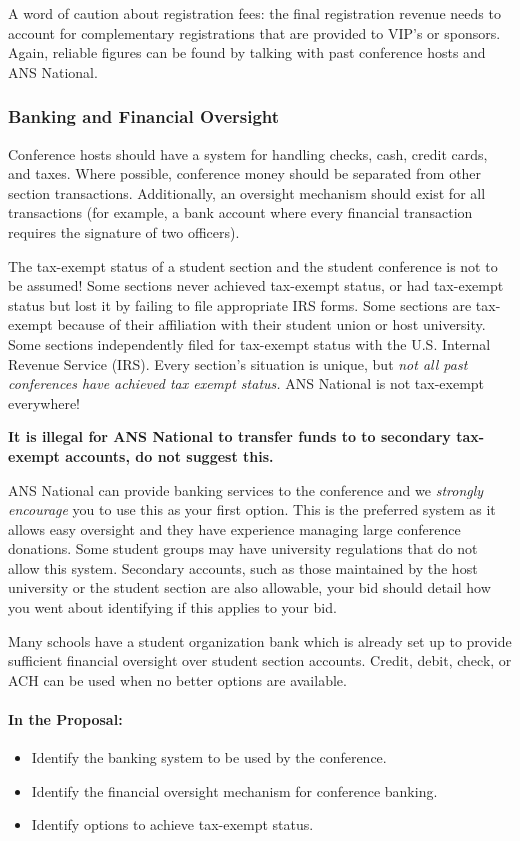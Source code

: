 \documentclass[12pt]{article}
\begin{document}
A word of caution about registration fees: the final registration revenue needs to account for complementary registrations that are provided to VIP's or sponsors. Again, reliable figures can be found by talking with past conference hosts and ANS National.

\subsubsection{Banking and Financial Oversight}
Conference hosts should have a system for handling checks, cash, credit cards, and taxes. Where possible, conference money should be separated from other section transactions. Additionally, an oversight mechanism should exist for all transactions (for example, a bank account where every financial transaction requires the signature of two officers).

The tax-exempt status of a student section and the student conference is not to be assumed! Some sections never achieved tax-exempt status, or had tax-exempt status but lost it by failing to file appropriate IRS forms. Some sections are tax-exempt because of their affiliation with their student union or host university. Some sections independently filed for tax-exempt status with the U.S. Internal Revenue Service (IRS). Every section’s situation is unique, but \textit{not all past conferences have achieved tax exempt status.} ANS National is not tax-exempt everywhere!

\textbf{It is illegal for ANS National to transfer funds to to secondary tax-exempt accounts, do not suggest this.}

ANS National can provide banking services to the conference and we \textit{strongly encourage} you to use this as your first option. This is the preferred system as it allows easy oversight and they have experience managing large conference donations. Some student groups may have university regulations that do not allow this system. Secondary accounts, such as those maintained by the host university or the student section are also allowable, your bid should detail how you went about identifying if this applies to your bid.

Many schools have a student organization bank which is already set up to provide sufficient financial oversight over student section accounts. Credit, debit, check, or ACH can be used when no better options are available.

\paragraph{In the Proposal:}
\begin{itemize}
\item{Identify the banking system to be used by the conference.}
\item{Identify the financial oversight mechanism for conference banking.}
\item{Identify options to achieve tax-exempt status.}
\end{itemize}
\end{document}

